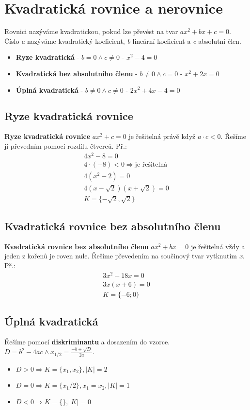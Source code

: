\documentclass[12pt, a4paper]{article}
\newcommand{\imply}{\Rightarrow}
\begin{document}
\section{Kvadratická rovnice a nerovnice}

Rovnici nazýváme kvadratickou, pokud lze převést na tvar $ax^2+bx+c=0$.\\
Číslo \textit{a} nazýváme kvadratický koeficient, \textit{b} lineární koeficient a \textit{c} absolutní člen.\\
\begin{itemize}
\item \textbf{Ryze kvadratická} - $b = 0 \land c \neq 0$ - $x^2-4=0$
\item \textbf{Kvadratická bez absolutního členu} - $b \neq 0 \land c = 0$ - $x^2+2x=0$
\item \textbf{Úplná kvadratická} - $b \neq 0 \land c \neq 0$ - $2x^2+4x-4=0$
\end{itemize}

\subsection*{Ryze kvadratická rovnice}
\textbf{Ryze kvadratická rovnice} $ax^2+c=0$ je řešitelná právě když $a \cdot c < 0$. Řešíme ji převedním pomocí rozdílu čtverců.
Př.:\\
\[
\begin{aligned}
4x^2-8=0\\
4 \cdot (-8) < 0 \imply\text{je řešitelná}\\
4(x^2-2)=0\\
4(x-\sqrt{2})(x+\sqrt{2}) = 0\\
K = \{ -\sqrt{2}, \sqrt{2} \}
\end{aligned}
\]

\subsection*{Kvadratická rovnice bez absolutního členu}
\textbf{Kvadratická rovnice bez absolutního členu} $ax^2+bx=0$ je řešitelná vždy a jeden z kořenů je roven nule. Řešíme převedením na součinový tvar vytknutím \textit{x}.
Př.:\\
\[\begin{aligned}
3x^2 + 18x = 0\\
3x(x+6)=0\\
K = \{ -6;0 \}
\end{aligned}\]

\subsection*{Úplná kvadratická}
Řešíme pomocí \textbf{diskriminantu} a dosazením do vzorce.\\ $D = b^2-4ac \land x_{1/2}=\frac{-b \pm \sqrt{D}}{2a}$.\\
\pagebreak
\begin{itemize}
\item $D > 0 \imply K=\{x_1, x_2\}, |K|=2$
\item $D = 0 \imply K = \{x_1/2\}, x_1=x_2, |K|=1$
\item $D < 0 \imply K = \{\}, |K|=0$
\end{itemize}
\end{document}
